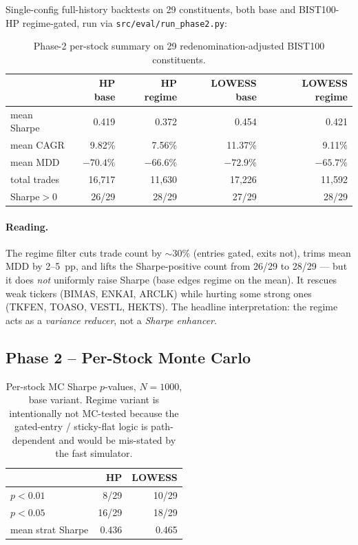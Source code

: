 \documentclass[11pt,a4paper]{article}
\begin{document}
Single-config full-history backtests on 29 constituents, both base and
BIST100-HP regime-gated, run via \texttt{src/eval/run\_phase2.py}:

\begin{table}[h]
\centering
\begin{tabular}{@{}lrrrr@{}}
\toprule
& \textbf{HP base} & \textbf{HP regime} & \textbf{LOWESS base} & \textbf{LOWESS regime} \\
\midrule
mean Sharpe   & 0.419 & 0.372 & 0.454 & 0.421 \\
mean CAGR     & 9.82\% & 7.56\% & 11.37\% & 9.11\% \\
mean MDD      & $-70.4\%$ & $-66.6\%$ & $-72.9\%$ & $-65.7\%$ \\
total trades  & 16{,}717 & 11{,}630 & 17{,}226 & 11{,}592 \\
Sharpe$>$0    & 26/29 & 28/29 & 27/29 & 28/29 \\
\bottomrule
\end{tabular}
\caption{Phase-2 per-stock summary on 29 redenomination-adjusted BIST100
constituents.}
\end{table}

\paragraph{Reading.} The regime filter cuts trade count by $\sim$30\% (entries
gated, exits not), trims mean MDD by 2--5~pp, and lifts the
Sharpe-positive count from 26/29 to 28/29 --- but it does \emph{not} uniformly
raise Sharpe (base edges regime on the mean). It rescues weak tickers (BIMAS,
ENKAI, ARCLK) while hurting some strong ones (TKFEN, TOASO, VESTL, HEKTS).
The headline interpretation: the regime acts as a \emph{variance reducer},
not a \emph{Sharpe enhancer}.

\subsection{Phase 2 -- Per-Stock Monte Carlo}

\begin{table}[h]
\centering
\begin{tabular}{@{}lrr@{}}
\toprule
& \textbf{HP} & \textbf{LOWESS} \\
\midrule
$p<0.01$            & 8/29  & 10/29 \\
$p<0.05$            & 16/29 & 18/29 \\
mean strat Sharpe   & 0.436 & 0.465 \\
\bottomrule
\end{tabular}
\caption{Per-stock MC Sharpe $p$-values, $N{=}1000$, base variant. Regime
variant is intentionally not MC-tested because the gated-entry / sticky-flat
logic is path-dependent and would be mis-stated by the fast simulator.}
\end{table}
\end{document}
